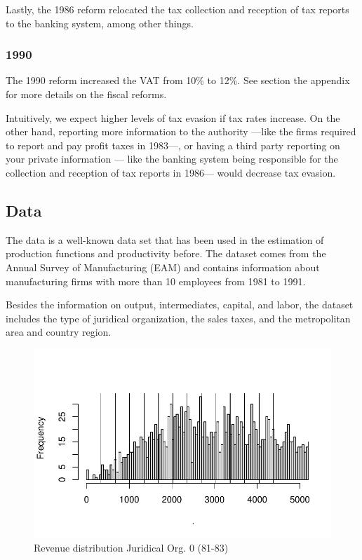 \documentclass[
  12pt]{article}
\begin{document}
Lastly, the 1986 reform relocated the tax collection and reception of
tax reports to the banking system, among other things.

\hypertarget{section-2}{%
\subsubsection{1990}\label{section-2}}

The 1990 reform increased the VAT from 10\% to 12\%. See section the
appendix for more details on the fiscal reforms.

Intuitively, we expect higher levels of tax evasion if tax rates
increase. On the other hand, reporting more information to the authority
---like the firms required to report and pay profit taxes in 1983---, or
having a third party reporting on your private information --- like the
banking system being responsible for the collection and reception of tax
reports in 1986--- would decrease tax evasion.

\hypertarget{data}{%
\subsection{Data}\label{data}}

The data is a well-known data set that has been used in the estimation
of production functions and productivity before. The dataset comes from
the Annual Survey of Manufacturing (EAM) and contains information about
manufacturing firms with more than 10 employees from 1981 to 1991.

Besides the information on output, intermediates, capital, and labor,
the dataset includes the type of juridical organization, the sales
taxes, and the metropolitan area and country region.

\begin{figure}

{\centering \includegraphics{Tax-Prod_files/figure-pdf/fig-revenue-hist-bunch-0-1.pdf}

}

\caption{\label{fig-revenue-hist-bunch-0}Revenue distribution Juridical
Org. 0 (81-83)}

\end{figure}
\end{document}
